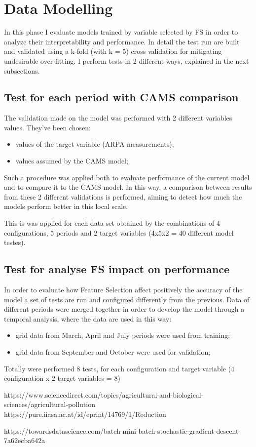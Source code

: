 \section{Data Modelling}
In this phase I evaluate models trained by variable selected by FS in order to analyze their interpretability and performance.
In detail the test run are built and validated using a k-fold (with k = 5) cross validation for mitigating undesirable over-fitting. 
I perform tests in 2 different ways, explained in the next subsections.
\subsection{Test for each period with CAMS comparison}
The validation made on the model was performed with 2 different variables values. They've been chosen:
\begin{itemize}
\item values of the target variable (ARPA measurements);
\item values assumed by the CAMS model;
\end{itemize}
Such a procedure was applied both to evaluate performance of the current model and to compare it to the CAMS model.
In this way, a comparison between results from these 2 different validations is performed, aiming to detect how much the models perform better in this local scale.\par
This is was applied for each data set obtained by the combinations of 4 configurations, 5 periods and 2 target variables (4x5x2 = 40 different model testes). 
\subsection{Test for analyse FS impact on performance}
In order to evaluate how Feature Selection affect positively the accuracy of the model a set of tests are run and configured differently from the previous. 
Data of different periods were merged together in order to develop the model through a temporal analysis, where the data are used in this way:
\begin{itemize}
    \item grid data from March, April and July periods were used from training;
    \item grid data from September and October were used for validation;
\end{itemize}

Totally were performed 8 tests, for each configuration and target variable (4 configuration x 2 target variables = 8)

https://www.sciencedirect.com/topics/agricultural-and-biological-sciences/agricultural-pollution 
https://pure.iiasa.ac.at/id/eprint/14769/1/Reduction%

https://towardsdatascience.com/batch-mini-batch-stochastic-gradient-descent-7a62ecba642a